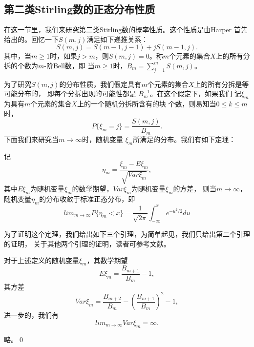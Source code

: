\subsection{第二类Stirling数的正态分布性质}

在这一节里，我们来研究第二类Stirling数的概率性质。这个性质是由Harper\cite{Harper1967}
首先给出的。回忆一下$S(m,j)$满足如下递推关系：
\begin{equation}\label{St}
S(m,j)=S(m-1,j-1)+jS(m-1,j).
\end{equation}
其中，当$m\geq
1$时，如果$j>m$，则$S(m,j)=0$。称$m$个元素的集合$X$上的所有分拆的个数为$m$-阶Bell数，即
当$m\geq 1$时，$B_m=\sum\limits_{j=1}^{m}S(m,j)$。


为了研究$S(m,j)$的分布性质，我们假定具有$m$个元素的集合$X$上的所有分拆是等可能分布的，
即每个分拆出现的可能性都是 $B_m^{-1}$。在这个假定下，如果我们
记$\xi_m$为具有$m$个元素的集合$X$上的一个随机分拆所含有的块
个数，则易知当$0\leq k\leq m$时，
\begin{equation}\label{xik}
P\{\xi_m=j\}=\frac{S(m,j)}{B_m}.
\end{equation}
下面我们来研究当$m\rightarrow \infty$时，随机变量
$\xi_m$所满足的分布。我们有如下定理：

\begin{thm}\label{secstirling}
记
\begin{equation}
\eta_m=\frac{\xi_m-E\xi_m}{\sqrt {Var\xi_m}},
\end{equation}
其中$E\xi_m$为随机变量$\xi_m$的数学期望，$Var\xi_m$为随机变量$\xi_m$的方差，
则当$m\rightarrow
\infty$，随机变量$\eta_m$的分布收敛于标准正态分布，即
\[
lim_{m\rightarrow \infty}P\{\eta_m
<x\}=\frac{1}{\sqrt{2\pi}}\int_{-\infty}^{x}e^{-u^2/2}du
\]
\end{thm}

为了证明这个定理，我们给出如下三个引理，为简单起见，我们只给出第二个引理的证明，
关于其他两个引理的证明，读者可参考文献\cite{Sachkov1997}。
\begin{lem}\label{EVar}
对于上述定义的随机变量$\xi_m$，其数学期望
\begin{equation}
E\xi_m=\frac{B_{m+1}}{B_m}-1,
\end{equation}
其方差
\begin{equation}
Var\xi_m=\frac{B_{m+2}}{B_m}-(\frac{B_{m+1}}{B_m})^2-1,
\end{equation}
进一步的，我们有
\begin{equation}
lim_{m\rightarrow \infty}Var\xi_m=\infty.
\end{equation}
\end{lem}
 略。\qed


